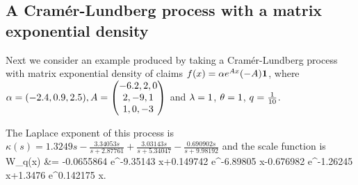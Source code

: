\newpage

\subsection{A Cram\'{e}r-Lundberg process with a matrix exponential density} \label{e:MatExp6220}

Next we consider an example produced by taking a Cram\'{e}r-Lundberg process with matrix exponential density of claims $f(x)=\alpha e^{A x} (-A) {\mbox{\boldmath$1$}} $, where $\alpha=(-2.4, 0.9 , 2.5),  A = \begin{pmatrix}
   {-6.2, 2, 0}\\
   {2, -9, 1}\\
   {1, 0, -3}\end{pmatrix}$
and $\lambda=1$, $\theta=1$, $q=\frac{1}{10}$.

The Laplace exponent of this process is
$\kappa(s) = 1.3249 s -\frac{3.34053 s}{s+2.87761}+\frac{3.03143 s}{s+5.34047}-\frac{0.690902 s}{s+9.98192}$ and the scale function is
\bea
W_q(x)  &= -0.0655864 e^{-9.35143 x}+0.149742 e^{-6.89805 x}-0.676982 e^{-1.26245 x}+1.3476 e^{0.142175 x}.
\eea

